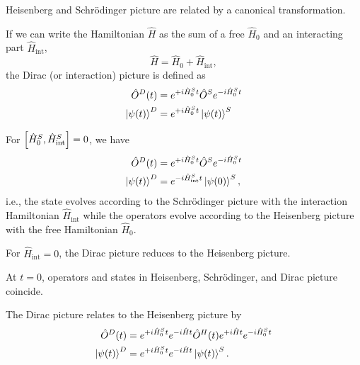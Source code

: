 \begin{lemma}\label{thm:heisenberg_schroedinger_canonical_transformation}
	Heisenberg and Schrödinger picture are related by a canonical transformation.
\end{lemma}
\begin{definition}
	If we can write the Hamiltonian $\hat{H}$ as the sum of a free $\hat{H}_0$ and an interacting part $\hat{H}_\text{int}$,
	\begin{equation}
		\hat{H}
		=
		\hat{H}_0
		+
		\hat{H}_\text{int}
		,
	\end{equation}
	the Dirac (or interaction) picture is defined as
	\begin{align}
		\hat{O}^D(t)
		&=
		e^{+i\hat{H}_0^St}
		\hat{O}^S
		e^{-i\hat{H}_0^St}
		\\
		\ket{\psi(t)}^D
		&=
		e^{+i\hat{H}_0^St}
		\ket{\psi(t)}^S
	\end{align}
\end{definition}
\begin{remark}
	For $\comm{\hat{H}_0^S}{\hat{H}_\text{int}^S}=0$, we have
	\begin{align}
		\hat{O}^D(t)
		&=
		e^{+i\hat{H}_0^St}
		\hat{O}^S
		e^{-i\hat{H}_0^St}
		\\
		\ket{\psi(t)}^D
		&=
		e^{-i\hat{H}_\text{int}^St}
		\ket{\psi(0)}^S
		,
	\end{align}
	i.e., the state evolves according to the Schrödinger picture with the interaction Hamiltonian $\hat{H}_\text{int}$ while the operators evolve according to the Heisenberg picture with the free Hamiltonian $\hat{H}_0$.
\end{remark}
\begin{corollary}
	For $\hat{H}_\text{int}=0$, the Dirac picture reduces to the Heisenberg picture.
\end{corollary}
\begin{corollary}
	At $t=0$, operators and states in Heisenberg, Schrödinger, and Dirac picture coincide.
\end{corollary}
\begin{lemma}
	The Dirac picture relates to the Heisenberg picture by
	\begin{align}
		\hat{O}^D(t)
		&=
		e^{+i\hat{H}_0^St}
		e^{-i\hat{H}t}
		\hat{O}^H(t)
		e^{+i\hat{H}t}
		e^{-i\hat{H}_0^St}
		\\
		\ket{\psi(t)}^D
		&=
		e^{+i\hat{H}_0^St}
		e^{-i\hat{H}t}
		\ket{\psi(t)}^S
		.
	\end{align}
\end{lemma}
